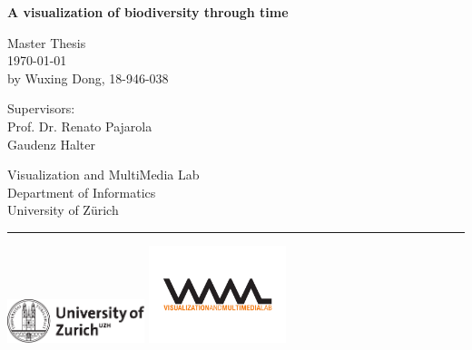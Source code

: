 \documentclass[11pt, a4paper,oneside,chapterprefix=false]{scrbook}
\begin{document}
\frontmatter
\begin{titlepage}
	\setlength{\parindent}{0cm}
	\addtolength{\textheight}{1.0cm}

	\vspace{0.5cm}
	\Huge
	{\textbf{A visualization of biodiversity through time\\ }}

	\vfill \vfill \vfill
	\vfill
	\sf \Large
	Master Thesis \\
	\today \\[0.5cm]
	\large
	by Wuxing Dong, 18-946-038

	\vfill \vfill \vfill
	\begin{minipage}[b]{0.5\textwidth}
	Supervisors: \\
	Prof. Dr. Renato Pajarola \\
	Gaudenz Halter \\
	\end{minipage}
	\begin{minipage}[b]{0.5\textwidth} \raggedleft
	Visualization and MultiMedia Lab \\
	Department of Informatics \\
	University of Z{\"u}rich
	\end{minipage}

	\vfill
	\hrule
	\vspace{0.5cm}
	\includegraphics*[width=0.3\textwidth]{figures/cover/uzh_logo} \hfill
	\includegraphics*[width=0.3\textwidth]{figures/cover/vmml_logo}
\end{titlepage}


\end{document}
